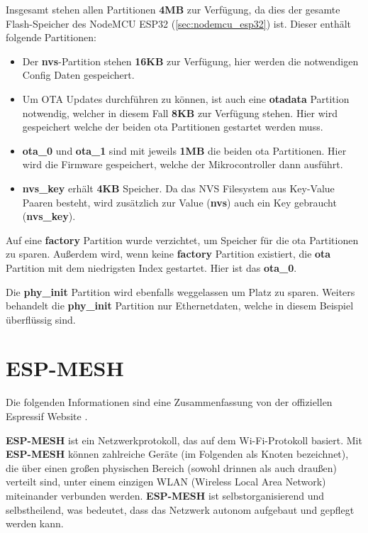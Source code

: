 Insgesamt stehen allen Partitionen \textbf{4MB} zur Verfügung, da dies der gesamte Flash-Speicher des NodeMCU ESP32 (\ref{sec:nodemcu_esp32}) ist. Dieser enthält folgende Partitionen:
\begin{itemize}
    \item Der \textbf{nvs}-Partition stehen \textbf{16KB} zur Verfügung, hier werden die notwendigen Config Daten gespeichert.
    \item Um OTA Updates durchführen zu können, ist auch eine \textbf{otadata} Partition notwendig, welcher in diesem Fall \textbf{8KB} zur Verfügung stehen. Hier wird gespeichert welche der beiden ota Partitionen gestartet werden muss.
    \item \textbf{ota\_0} und \textbf{ota\_1} sind mit jeweils \textbf{1MB} die beiden ota Partitionen. Hier wird die Firmware gespeichert, welche der Mikrocontroller dann ausführt.
    \item \textbf{nvs\_key} erhält \textbf{4KB} Speicher. Da das NVS Filesystem aus Key-Value Paaren besteht, wird zusätzlich zur Value (\textbf{nvs}) auch ein Key gebraucht (\textbf{nvs\_key}).
\end{itemize}

Auf eine \textbf{factory} Partition wurde verzichtet, um Speicher für die ota Partitionen zu sparen. Außerdem wird, wenn keine \textbf{factory} Partition existiert, die \textbf{ota} Partition mit dem niedrigsten Index gestartet. Hier ist das \textbf{ota\_0}.

Die \textbf{phy\_init} Partition wird ebenfalls weggelassen um Platz zu sparen. Weiters behandelt die \textbf{phy\_init} Partition nur Ethernetdaten, welche in diesem Beispiel überflüssig sind.

\section{ESP-MESH}\label{sec:mesh}

Die folgenden Informationen sind eine Zusammenfassung von der offiziellen Espressif Website \cite{esp-mesh}.

\textbf{ESP-MESH} ist ein Netzwerkprotokoll, das auf dem Wi-Fi-Protokoll basiert. Mit \textbf{ESP-MESH} können zahlreiche Geräte (im Folgenden als Knoten bezeichnet), die über einen großen physischen Bereich (sowohl drinnen als auch draußen) verteilt sind, unter einem einzigen WLAN (Wireless Local Area Network) miteinander verbunden werden. \textbf{ESP-MESH} ist selbstorganisierend und selbstheilend, was bedeutet, dass das Netzwerk autonom aufgebaut und gepflegt werden kann.


